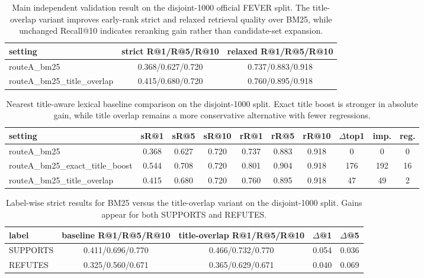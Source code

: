 \begin{table}[t]
\centering
\caption{Main independent validation result on the disjoint-1000 official FEVER split. The title-overlap variant improves early-rank strict and relaxed retrieval quality over BM25, while unchanged Recall@10 indicates reranking gain rather than candidate-set expansion.}
\begin{tabular}{lcc}
\hline
setting & strict R@1/R@5/R@10 & relaxed R@1/R@5/R@10 \\
\hline
routeA\_bm25 & 0.368/0.627/0.720 & 0.737/0.883/0.918 \\
routeA\_bm25\_title\_overlap & 0.415/0.680/0.720 & 0.760/0.895/0.918 \\
\hline
\end{tabular}
\end{table}

\begin{table}[t]
\centering
\caption{Nearest title-aware lexical baseline comparison on the disjoint-1000 split. Exact title boost is stronger in absolute gain, while title overlap remains a more conservative alternative with fewer regressions.}
\begin{tabular}{lccccccccc}
\hline
setting & sR@1 & sR@5 & sR@10 & rR@1 & rR@5 & rR@10 & $\Delta$top1 & imp. & reg. \\
\hline
routeA\_bm25 & 0.368 & 0.627 & 0.720 & 0.737 & 0.883 & 0.918 & 0 & 0 & 0 \\
routeA\_bm25\_exact\_title\_boost & 0.544 & 0.708 & 0.720 & 0.801 & 0.904 & 0.918 & 176 & 192 & 16 \\
routeA\_bm25\_title\_overlap & 0.415 & 0.680 & 0.720 & 0.760 & 0.895 & 0.918 & 47 & 49 & 2 \\
\hline
\end{tabular}
\end{table}

\begin{table}[t]
\centering
\caption{Label-wise strict results for BM25 versus the title-overlap variant on the disjoint-1000 split. Gains appear for both SUPPORTS and REFUTES.}
\begin{tabular}{lcccc}
\hline
label & baseline R@1/R@5/R@10 & title-overlap R@1/R@5/R@10 & $\Delta$@1 & $\Delta$@5 \\
\hline
SUPPORTS & 0.411/0.696/0.770 & 0.466/0.732/0.770 & 0.054 & 0.036 \\
REFUTES & 0.325/0.560/0.671 & 0.365/0.629/0.671 & 0.040 & 0.069 \\
\hline
\end{tabular}
\end{table}

